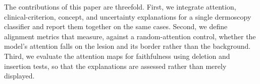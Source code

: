 The contributions of this paper are threefold. First, we integrate attention,
clinical-criterion, concept, and uncertainty explanations for a single
dermoscopy classifier and report them together on the same cases. Second, we
define alignment metrics that measure, against a random-attention control,
whether the model's attention falls on the lesion and its border rather than
the background. Third, we evaluate the attention maps for faithfulness using
deletion and insertion tests, so that the explanations are assessed rather than
merely displayed.
